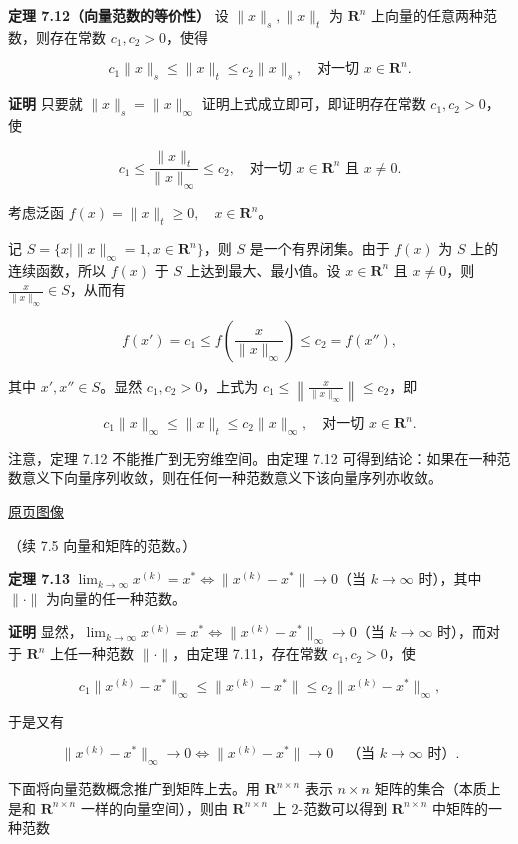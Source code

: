 \documentclass[
  10pt,
  fontset=fandol]{ctexart}
\begin{document}
\textbf{定理 7.12（向量范数的等价性）} 设 \(\|x\|_s,\|x\|_t\) 为 \(\mathbf R^n\) 上向量的任意两种范数，则存在常数 \(c_1,c_2>0\)，使得

\[
c_1\|x\|_s\leqslant\|x\|_t\leqslant c_2\|x\|_s,\quad\text{对一切 }x\in\mathbf R^n.
\]

\textbf{证明} 只要就 \(\|x\|_s=\|x\|_\infty\) 证明上式成立即可，即证明存在常数 \(c_1,c_2>0\)，使

\[
c_1\leqslant\frac{\|x\|_t}{\|x\|_\infty}\leqslant c_2,\quad\text{对一切 }x\in\mathbf R^n\text{ 且 }x\neq0.
\]

考虑泛函 \(f(x)=\|x\|_t\geqslant0,\quad x\in\mathbf R^n\)。

记 \(S=\{x\mid\|x\|_\infty=1,x\in\mathbf R^n\}\)，则 \(S\) 是一个有界闭集。由于 \(f(x)\) 为 \(S\) 上的连续函数，所以 \(f(x)\) 于 \(S\) 上达到最大、最小值。设 \(x\in\mathbf R^n\) 且 \(x\neq0\)，则 \(\frac{x}{\|x\|_\infty}\in S\)，从而有

\[
f(x')=c_1\leqslant f\left(\frac{x}{\|x\|_\infty}\right)\leqslant c_2=f(x''),
\tag{7.5.3}
\]

其中 \(x',x''\in S\)。显然 \(c_1,c_2>0\)，上式为 \(c_1\leqslant\left\|\frac{x}{\|x\|_\infty}\right\|\leqslant c_2\)，即

\[
c_1\|x\|_\infty\leqslant\|x\|_t\leqslant c_2\|x\|_\infty,\quad\text{对一切 }x\in\mathbf R^n.
\]

注意，定理 7.12 不能推广到无穷维空间。由定理 7.12 可得到结论：如果在一种范数意义下向量序列收敛，则在任何一种范数意义下该向量序列亦收敛。

\href{../../source-images/pdf-202.jpeg}{原页图像}

（续 7.5 向量和矩阵的范数。）

\textbf{定理 7.13} \(\lim_{k\to\infty}x^{(k)}=x^*\Longleftrightarrow\|x^{(k)}-x^*\|\to0\)（当 \(k\to\infty\) 时），其中 \(\|\cdot\|\) 为向量的任一种范数。

\textbf{证明} 显然，\(\lim_{k\to\infty}x^{(k)}=x^*\Longleftrightarrow\|x^{(k)}-x^*\|_\infty\to0\)（当 \(k\to\infty\) 时），而对于 \(\mathbf R^n\) 上任一种范数 \(\|\cdot\|\)，由定理 7.11，存在常数 \(c_1,c_2>0\)，使

\[
c_1\|x^{(k)}-x^*\|_\infty\leqslant\|x^{(k)}-x^*\|\leqslant c_2\|x^{(k)}-x^*\|_\infty,
\]

于是又有

\[
\|x^{(k)}-x^*\|_\infty\to0\Longleftrightarrow\|x^{(k)}-x^*\|\to0\quad\text{（当 }k\to\infty\text{ 时）}.
\]

下面将向量范数概念推广到矩阵上去。用 \(\mathbf R^{n\times n}\) 表示 \(n\times n\) 矩阵的集合（本质上是和 \(\mathbf R^{n\times n}\) 一样的向量空间），则由 \(\mathbf R^{n\times n}\) 上 2-范数可以得到 \(\mathbf R^{n\times n}\) 中矩阵的一种范数
\end{document}
